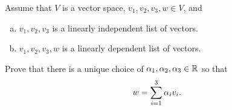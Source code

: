 \begin{question}
    \normalfont

    Assume that $V$ is a vector space, $v_1,v_2,v_3,w\in V$, and
    \begin{enumerate}[(a)]
        \item $v_1,v_2,v_3$ \hspace{.1cm} is a linearly independent list of vectors.
        \item $v_1,v_2,v_3,w$ \hspace{.1cm}  is a linearly dependent list of vectors.
    \end{enumerate}
    Prove that there is a unique choice of $\alpha_1,\alpha_2,\alpha_3\in{\mathbb R}$ so that
    \begin{align*}
        w=\sum_{i=1}^3 \alpha_iv_i.
    \end{align*}
\end{question}

